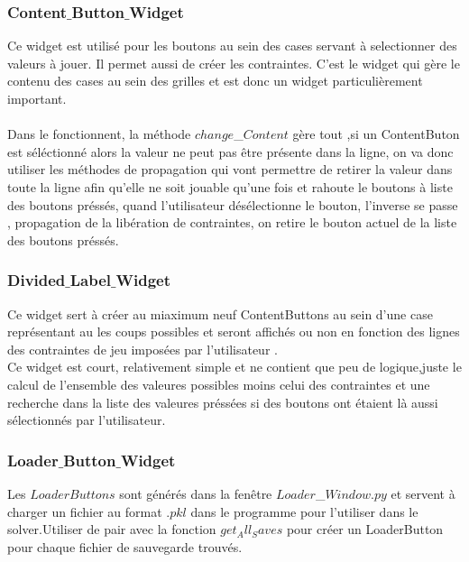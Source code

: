 \documentclass[french,12pt]{article}
\begin{document}
\subsubsection{Content$\_$Button$\_$Widget}
Ce widget est utilisé pour les boutons au sein des cases servant à selectionner des valeurs à jouer. Il permet aussi de créer les contraintes. C'est le widget qui gère le contenu des cases au sein des grilles et est donc un widget particulièrement important. \\ \\
Dans le fonctionnent, la méthode $change$\_$Content$ gère tout ,si un ContentButon est séléctionné alors la valeur ne peut pas être présente dans la ligne, on va donc utiliser les méthodes de propagation qui vont permettre de retirer la valeur dans toute la ligne afin qu'elle ne soit jouable qu'une fois et rahoute le boutons à liste des boutons préssés, quand l'utilisateur désélectionne le bouton, l'inverse se passe , propagation de la libération de contraintes, on retire le bouton actuel de la liste des boutons préssés. 
\\


\newpage
\subsubsection{Divided$\_$Label$\_$Widget}

Ce widget sert à créer au miaximum neuf ContentButtons au sein d'une case représentant au les coups possibles et seront affichés ou non en fonction des lignes des contraintes de jeu imposées par l'utilisateur . \\
Ce widget est court, relativement simple et ne contient que peu de logique,juste le calcul de l'ensemble des valeures possibles moins celui des contraintes et une recherche dans la liste des valeures préssées si des boutons ont étaient là aussi sélectionnés par l'utilisateur. 

\subsubsection{Loader$\_$Button$\_$Widget}

Les $LoaderButtons$ sont générés dans la fenêtre $Loader$\_$Window.py$ et servent à charger un fichier au format $.pkl$ dans le programme pour l'utiliser dans le solver.Utiliser de pair avec la fonction $get_All_Saves$ pour créer un LoaderButton pour chaque fichier de sauvegarde trouvés. \\
\end{document}
